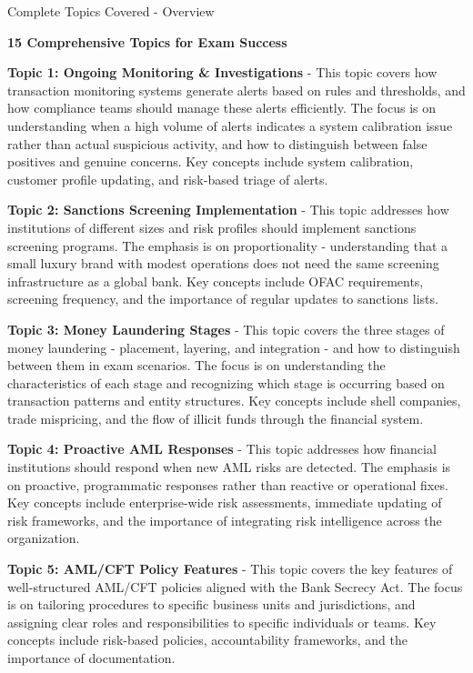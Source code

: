 \documentclass[8pt]{beamer}  %
\begin{document}
	\begin{frame}{Complete Topics Covered - Overview}
		\begin{center}
			\large \textbf{15 Comprehensive Topics for Exam Success}
		\end{center}
		\vspace{0.2cm}
		
		\textbf{Topic 1: Ongoing Monitoring \& Investigations} - This topic covers how transaction monitoring systems generate alerts based on rules and thresholds, and how compliance teams should manage these alerts efficiently. The focus is on understanding when a high volume of alerts indicates a system calibration issue rather than actual suspicious activity, and how to distinguish between false positives and genuine concerns. Key concepts include system calibration, customer profile updating, and risk-based triage of alerts.
		
		\vspace{0.2cm}
		\textbf{Topic 2: Sanctions Screening Implementation} - This topic addresses how institutions of different sizes and risk profiles should implement sanctions screening programs. The emphasis is on proportionality - understanding that a small luxury brand with modest operations does not need the same screening infrastructure as a global bank. Key concepts include OFAC requirements, screening frequency, and the importance of regular updates to sanctions lists.
		
		\vspace{0.2cm}
		\textbf{Topic 3: Money Laundering Stages} - This topic covers the three stages of money laundering - placement, layering, and integration - and how to distinguish between them in exam scenarios. The focus is on understanding the characteristics of each stage and recognizing which stage is occurring based on transaction patterns and entity structures. Key concepts include shell companies, trade mispricing, and the flow of illicit funds through the financial system.
		
		\vspace{0.2cm}
		\textbf{Topic 4: Proactive AML Responses} - This topic addresses how financial institutions should respond when new AML risks are detected. The emphasis is on proactive, programmatic responses rather than reactive or operational fixes. Key concepts include enterprise-wide risk assessments, immediate updating of risk frameworks, and the importance of integrating risk intelligence across the organization.
		
		\vspace{0.2cm}
		\textbf{Topic 5: AML/CFT Policy Features} - This topic covers the key features of well-structured AML/CFT policies aligned with the Bank Secrecy Act. The focus is on tailoring procedures to specific business units and jurisdictions, and assigning clear roles and responsibilities to specific individuals or teams. Key concepts include risk-based policies, accountability frameworks, and the importance of documentation.
		

\end{frame}
\end{document}
